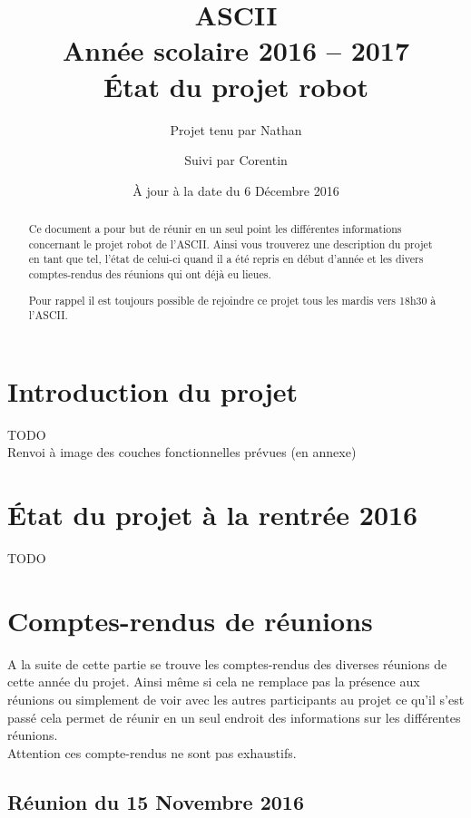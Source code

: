 \documentclass{article}
\title{ASCII\\
Année scolaire 2016 -- 2017\\
État du projet robot}
\date{\`A jour à la date du 6 Décembre 2016}
\author{Projet tenu par Nathan \bsc{Touroux} \and Suivi par Corentin \bsc{Chédotal}}
\begin{document}
\maketitle

\begin{abstract}
    Ce document a pour but de réunir en un seul point les différentes informations concernant le projet robot de l'ASCII. Ainsi vous trouverez une description du projet en tant que tel, l'état de celui-ci quand il a été repris en début d'année et les divers comptes-rendus des réunions qui ont déjà eu lieues.
    
    Pour rappel il est toujours possible de rejoindre ce projet tous les mardis vers 18h30 à l'ASCII.
\end{abstract}

\newpage

\tableofcontents

\newpage

\section{Introduction du projet}

    TODO\\
    Renvoi à image des couches fonctionnelles prévues (en annexe)
    
\section{État du projet à la rentrée 2016}

    TODO
    
\section{Comptes-rendus de réunions}

    A la suite de cette partie se trouve les comptes-rendus des diverses réunions de cette année du projet. Ainsi même si cela ne remplace pas la présence aux réunions ou simplement de voir avec les autres participants au projet ce qu'il s'est passé cela permet de réunir en un seul endroit des informations sur les différentes réunions.\\ 
    Attention ces compte-rendus ne sont pas exhaustifs.

    \subsection{Réunion du 15 Novembre 2016}
    
\end{document}

